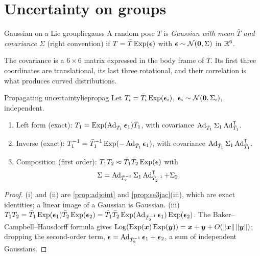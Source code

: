 \section{Uncertainty on groups}

\begin{definition}{Gaussian on a Lie group}{liegauss}
A random pose $T$ is \emph{Gaussian with mean $\bar T$ and covariance
$\Sigma$} (right convention) if $T=\bar T\operatorname{Exp}(\bm{\epsilon})$ with
$\bm{\epsilon}\sim\mathcal{N}(\bm{0},\Sigma)$ in $\mathbb{R}^6$.
\end{definition}

The covariance is a $6\times6$ matrix expressed in the body frame of
$\bar T$. Its first three coordinates are translational, its last three
rotational, and their correlation is what produces curved distributions.

\begin{proposition}{Propagating uncertainty}{liepropag}
Let $T_i=\bar T_i\operatorname{Exp}(\bm{\epsilon}_i)$, $\bm{\epsilon}_i\sim\mathcal{N}(
\bm{0},\Sigma_i)$, independent.
\begin{enumerate}[label=(\roman*),nosep]
\item Left form (exact): $T_1=\operatorname{Exp}(\operatorname{Ad}_{\bar T_1}\bm{\epsilon}_1)\bar
  T_1$, with covariance $\operatorname{Ad}_{\bar T_1}\Sigma_1\operatorname{Ad}_{\bar T_1}^{\mathsf{T}}$.
\item Inverse (exact): $T_1^{-1}=\bar T_1^{-1}\operatorname{Exp}(-\operatorname{Ad}_{\bar T_1}
  \bm{\epsilon}_1)$, with covariance $\operatorname{Ad}_{\bar T_1}\Sigma_1\operatorname{Ad}_{\bar T_1}
  ^{\mathsf{T}}$.
\item Composition (first order): $T_1T_2\approx\bar T_1\bar T_2\operatorname{Exp}
  (\bm{\epsilon})$ with
  \begin{equation}\label{eq:compound}
  \Sigma=\operatorname{Ad}_{\bar T_2^{-1}}\Sigma_1\operatorname{Ad}_{\bar T_2^{-1}}^{\mathsf{T}}+\Sigma_2 .
  \end{equation}
\end{enumerate}
\end{proposition}

\begin{proof}
(i) and (ii) are \cref{prop:adjoint} and \cref{prop:se3jac}(iii), which
are exact identities; a linear image of a Gaussian is Gaussian. (iii)
$T_1T_2=\bar T_1\operatorname{Exp}(\bm{\epsilon}_1)\bar T_2\operatorname{Exp}(\bm{\epsilon}_2)=
\bar T_1\bar T_2\operatorname{Exp}(\operatorname{Ad}_{\bar T_2^{-1}}\bm{\epsilon}_1)\operatorname{Exp}(
\bm{\epsilon}_2)$. The Baker--Campbell--Hausdorff formula gives
$\operatorname{Log}(\operatorname{Exp}(\bm{x})\operatorname{Exp}(\bm{y}))=\bm{x}+\bm{y}+O(\left\lVert \bm{x}\right\rVert
\left\lVert \bm{y}\right\rVert)$; dropping the second-order term, $\bm{\epsilon}=
\operatorname{Ad}_{\bar T_2^{-1}}\bm{\epsilon}_1+\bm{\epsilon}_2$, a sum of
independent Gaussians.
\end{proof}

